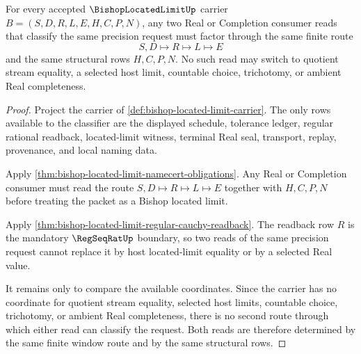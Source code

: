 \begin{theorem}
\label{thm:bishop-located-limit-window-determinacy}
For every accepted $\BishopLocatedLimitUp$ carrier $B=(S,D,R,L,E,H,C,P,N)$, any two Real or Completion consumer reads that classify the same precision request must factor through the same finite route
$$
S,D \longmapsto R \longmapsto L \longmapsto E
$$
and the same structural rows $H,C,P,N$. No such read may switch to quotient stream equality, a selected host limit, countable choice, trichotomy, or ambient Real completeness.
\end{theorem}
\begin{proof}
Project the carrier of \autoref{def:bishop-located-limit-carrier}. The only rows available to the classifier are the displayed schedule, tolerance ledger, regular rational readback, located-limit witness, terminal Real seal, transport, replay, provenance, and local naming data.

Apply \autoref{thm:bishop-located-limit-namecert-obligations}. Any Real or Completion consumer must read the route $S,D \longmapsto R \longmapsto L \longmapsto E$ together with $H,C,P,N$ before treating the packet as a Bishop located limit.

Apply \autoref{thm:bishop-located-limit-regular-cauchy-readback}. The readback row $R$ is the mandatory $\RegSeqRatUp$ boundary, so two reads of the same precision request cannot replace it by host located-limit equality or by a selected Real value.

It remains only to compare the available coordinates. Since the carrier has no coordinate for quotient stream equality, selected host limits, countable choice, trichotomy, or ambient Real completeness, there is no second route through which either read can classify the request. Both reads are therefore determined by the same finite window route and by the same structural rows.
\end{proof}



